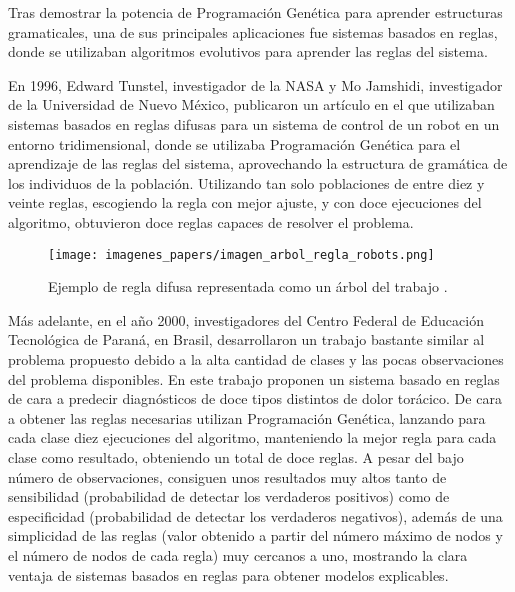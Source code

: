 Tras demostrar la potencia de Programación Genética para aprender estructuras gramaticales, una de sus principales aplicaciones fue sistemas basados en reglas, donde se utilizaban algoritmos evolutivos para aprender las reglas del sistema.

En 1996, Edward Tunstel, investigador de la NASA y Mo Jamshidi, investigador de la Universidad de Nuevo México, publicaron un artículo \cite{PGcontrolRobots} en el que utilizaban sistemas basados en reglas difusas para un sistema de control de un robot en un entorno tridimensional, donde se utilizaba Programación Genética para el aprendizaje de las reglas del sistema, aprovechando la estructura de gramática de los individuos de la población. Utilizando tan solo poblaciones de entre diez y veinte reglas, escogiendo la regla con mejor ajuste, y con doce ejecuciones del algoritmo, obtuvieron doce reglas capaces de resolver el problema.

\begin{figure}[H]
	\centering
	\texttt{[image: imagenes\_papers/imagen\_arbol\_regla\_robots.png]}
	\caption{Ejemplo de regla difusa representada como un árbol del trabajo \cite{PGcontrolRobots}.}
	\label{fig:imagen_arbol_regla_robots}
\end{figure}

Más adelante, en el año 2000, investigadores del Centro Federal de Educación Tecnológica de Paraná, en Brasil, desarrollaron un trabajo \cite{trabajoChestPain} bastante similar al problema propuesto debido a la alta cantidad de clases y las pocas observaciones del problema disponibles. En este trabajo proponen un sistema basado en reglas de cara a predecir diagnósticos de doce tipos distintos de dolor torácico. De cara a obtener las reglas necesarias utilizan Programación Genética, lanzando para cada clase diez ejecuciones del algoritmo, manteniendo la mejor regla para cada clase como resultado, obteniendo un total de doce reglas. A pesar del bajo número de observaciones, consiguen unos resultados muy altos tanto de sensibilidad (probabilidad de detectar los verdaderos positivos) como de especificidad (probabilidad de detectar los verdaderos negativos), además de una simplicidad de las reglas (valor obtenido a partir del número máximo de nodos y el número de nodos de cada regla) muy cercanos a uno, mostrando la clara ventaja de sistemas basados en reglas para obtener modelos explicables.

